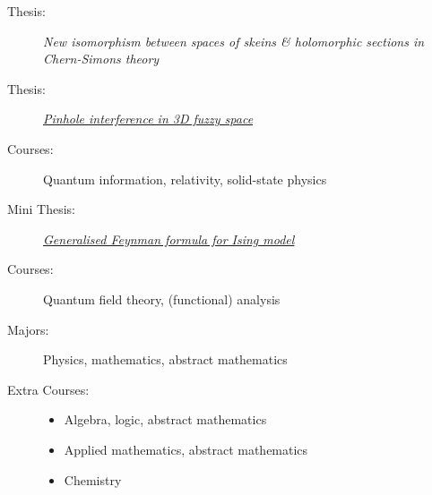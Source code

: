\documentclass[10pt,a4paper,ragged2e,withhyper]{altacv}
\begin{document}
\begin{paracol}{2}





\begin{description}
    \item[Thesis:] \textit{New isomorphism between spaces of skeins \& holomorphic sections in Chern-Simons theory}
\end{description}

\divider

\begin{description}
    \item[Thesis:] \href{https://doi.org/10019.1/126944}{\textit{Pinhole interference in 3D fuzzy space}}
    \item[Courses:] Quantum information, relativity, solid-state physics
\end{description}

\divider

\begin{description}
    \item[Mini Thesis:] \href{https://doi.org/10.5281/zenodo.8414170}{\textit{Generalised Feynman formula for Ising model}}
    \item[Courses:] Quantum field theory, (functional) analysis
\end{description}

\divider

\begin{description}
    \item[Majors:] Physics, mathematics, abstract mathematics
    \item[Extra Courses:] \quad
    \smallskip
    \begin{itemize}
        \item {} Algebra, logic, abstract mathematics
        \item {} Applied mathematics, abstract mathematics
        \item {} Chemistry
    \end{itemize}
\end{description}


\end{paracol}
\end{document}
